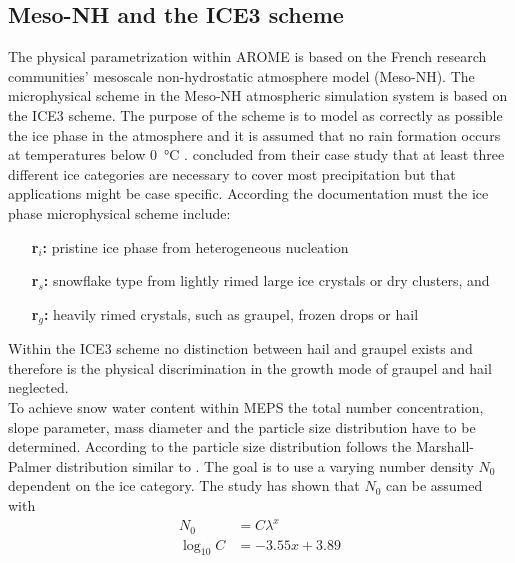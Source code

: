 \subsection{Meso-NH and the ICE3 scheme}
The physical parametrization within AROME is based on the French research communities' mesoscale non-hydrostatic atmosphere model (Meso-NH). The microphysical scheme in the Meso-NH atmospheric simulation system is based on the ICE3 scheme. The purpose of the scheme is to model as correctly as possible the ice phase in the atmosphere and it is assumed that no rain formation occurs at temperatures below \SI{0}{\celsius} \citep{pinty_mixed-phased_1998}. \cite{mccumber_comparison_1991} concluded from their case study that at least three different ice categories are necessary to cover most precipitation but that applications might be case specific. 
According the \cite{meteo_france_meso-nh_2009} documentation must the ice phase microphysical scheme include: 
\begin{itemize}
	\item [\textbf{r$_i$:}] pristine ice phase from heterogeneous nucleation 
	\item [\textbf{r$_s$:}] snowflake type from lightly rimed large ice crystals or dry clusters, and
	\item [\textbf{r$_g$:}] heavily rimed crystals, such as graupel, frozen drops or hail
\end{itemize}

Within the ICE3 scheme no distinction between hail and graupel exists and therefore is the physical discrimination in the growth mode of graupel and hail neglected. \\
To achieve snow water content within MEPS the total number concentration, slope parameter, mass diameter and  the particle size distribution have to be determined. 
According to \cite{caniaux_numerical_1994} the particle size distribution  follows the Marshall-Palmer distribution similar to . The goal is to use a varying number density $N_0$ dependent on the ice category. The study has shown that $N_0$ can be assumed with
\begin{align}
	N_0 & = C \lambda^x  \label{eq:N0}
	\\
	\log_{10}C & = -3.55x + 3.89  \nonumber
\end{align}
